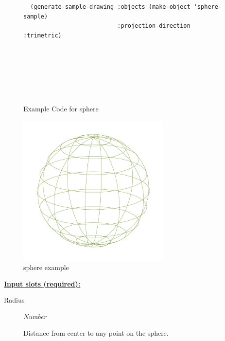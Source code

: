 \documentclass [11pt]{book}
\begin{document}
\begin{itemize}
\begin{figure}
\begin{lrbox}{\boxedverb}
\begin{minipage}{\linewidth}
{\begin{verbatim}
  (generate-sample-drawing :objects (make-object 'sphere-sample) 
                           :projection-direction :trimetric)





                  

\end{verbatim}}
\end{minipage}
\end{lrbox}
\fbox{\usebox{\boxedverb}}

\caption{Example Code for sphere}

\label{fig:example-code-sphere}

\end{figure}

\begin{figure}
\begin{center}
\includegraphics[width=3in,height=3in]{../images/example-sphere.pdf}
\end{center}

\caption{sphere example}

\label{fig:sphere}

\end{figure}





\textbf{
\underline{Input slots (required):}}

\begin{description}

\item [Radius]
\emph{Number}

 Distance from center to any point on the sphere.




\end{description}







\end{itemize}
\end{document}
